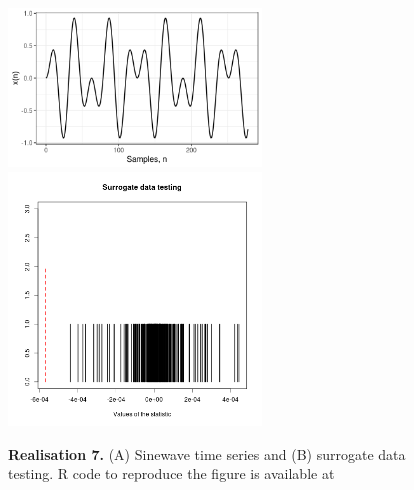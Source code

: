 \documentclass[11pt]{article}
\newcommand{\R}{\textsf{R}\xspace}
\newcommand{\codeicon}{{\color{linkcolor}\faFileCodeO}}
\newcommand{\codelink}[1]{\href{#1}{\codeicon}}
\begin{document}
\begin{figure}
\centering
\includegraphics[width=0.6\textwidth]{r7_ts_sinewaves_window_length_278} %
\includegraphics[width=0.6\textwidth]{r7_sdt_sinewaves_window_length_278} %
    \caption[]{
	{\bf Realisation 7.}
	(A) Sinewave time series and (B) surrogate data testing.
	\R code to reproduce the figure is available at 
	\codelink{https://github.com/mxochicale-phd/thesis/blob/master/0_code_data/1_code/x_surrogate/00_timeseries/code/B_.R}
	}
    \label{fig:thesis-outline}
\end{figure}
\end{document}
